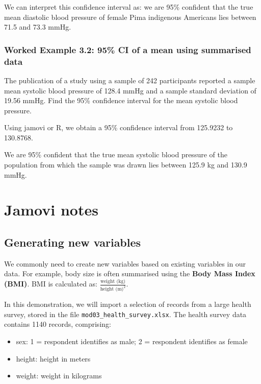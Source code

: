\documentclass[
  a4paper,
]{memoir}
\providecommand{\tightlist}{%
  \setlength{\itemsep}{0pt}\setlength{\parskip}{0pt}}
\begin{document}
We can interpret this confidence interval as: we are 95\% confident that
the true mean diastolic blood pressure of female Pima indigenous
Americans lies between 71.5 and 73.3 mmHg.

\subsection{Worked Example 3.2: 95\% CI of a mean using summarised
data}\label{worked-example-3.2-95-ci-of-a-mean-using-summarised-data}

The publication of a study using a sample of 242 participants reported a
sample mean systolic blood pressure of 128.4 mmHg and a sample standard
deviation of 19.56 mmHg. Find the 95\% confidence interval for the mean
systolic blood pressure.

Using jamovi or R, we obtain a 95\% confidence interval from 125.9232 to
130.8768.

We are 95\% confident that the true mean systolic blood pressure of the
population from which the sample was drawn lies between 125.9 kg and
130.9 mmHg.

\newpage{}


\chapter*{Jamovi notes}\label{jamovi-notes-1}


\section{Generating new variables}\label{generating-new-variables}

We commonly need to create new variables based on existing variables in
our data. For example, body size is often summarised using the
\textbf{Body Mass Index (BMI)}. BMI is calculated as:
\(\frac{\text{weight (kg)}}{\text{height (m)}^2}\).

In this demonstration, we will import a selection of records from a
large health survey, stored in the file
\texttt{mod03\_health\_survey.xlsx}. The health survey data contains
1140 records, comprising:

\begin{itemize}
\tightlist
\item
  sex: 1 = respondent identifies as male; 2 = respondent identifies as
  female
\item
  height: height in meters
\item
  weight: weight in kilograms
\end{itemize}
\end{document}
